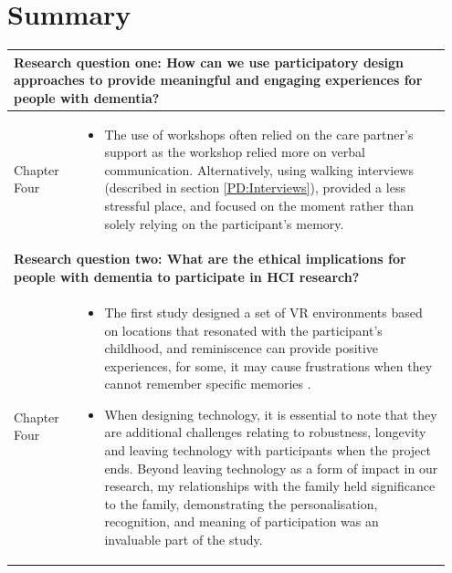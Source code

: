 \section{Summary}
\label{C4:Summary}

\begin{table}[htp]
    \centering
    \begin{tabular}{p{0.15\linewidth} | p{0.8\linewidth}}
      \multicolumn{2}{p{0.95\linewidth}}{\textbf{Research question one: How can we use participatory design approaches to provide meaningful and engaging experiences for people with dementia?}} 
      \\   \hline
      Chapter Four &
      \begin{itemize}
          \item The use of workshops often relied on the care partner's support as the workshop relied more on verbal communication. Alternatively, using walking interviews (described in section \ref{PD:Interviews}), provided a less stressful place, and focused on the moment rather than solely relying on the participant's memory.
      \end{itemize}
 \\ \hline
    \multicolumn{2}{p{0.95\linewidth}}{\textbf{Research question two: What are the ethical implications for people with dementia to participate in HCI research?}} 

    \\ \hline

     Chapter Four &
      \begin{itemize}
         \item The first study designed a set of VR environments based on locations that resonated with the participant's childhood, and reminiscence can provide positive experiences, for some, it may cause frustrations when they cannot remember specific memories \citep{lazar_critical_2017}.
         
        \item When designing technology, it is essential to note that they are additional challenges relating to robustness, longevity and leaving technology with participants when the project ends. Beyond leaving technology as a form of impact in our research, my relationships with the family held significance to the family, demonstrating the personalisation, recognition, and meaning of participation was an invaluable part of the study. 
        

\end{itemize}
\end{tabular}
\end{table}
